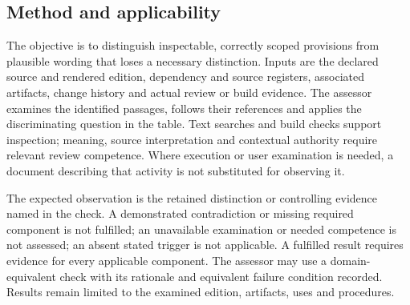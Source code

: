 \documentclass[11pt,a4paper]{article}
\begin{document}
\label{ann:self-assessment}
\subsection{Method and applicability}

The objective is to distinguish inspectable, correctly scoped provisions from plausible wording that loses a necessary distinction. Inputs are the declared source and rendered edition, dependency and source registers, associated artifacts, change history and actual review or build evidence. The assessor examines the identified passages, follows their references and applies the discriminating question in the table. Text searches and build checks support inspection; meaning, source interpretation and contextual authority require relevant review competence. Where execution or user examination is needed, a document describing that activity is not substituted for observing it.

The expected observation is the retained distinction or controlling evidence named in the check. A demonstrated contradiction or missing required component is not fulfilled; an unavailable examination or needed competence is not assessed; an absent stated trigger is not applicable. A fulfilled result requires evidence for every applicable component. The assessor may use a domain-equivalent check with its rationale and equivalent failure condition recorded. Results remain limited to the examined edition, artifacts, uses and procedures.
\end{document}
